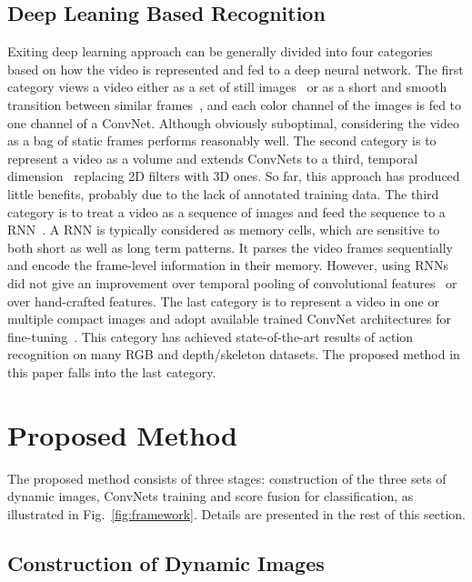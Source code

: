 \documentclass[10pt, a4paper, conference]{IEEEtran}
\begin{document}
\subsection{Deep Leaning Based Recognition}
Exiting deep learning approach can be generally divided into four categories based on how the video is represented and fed to a deep neural network. The first category views a video either as a set of still images~\cite{yue2015beyond} or as a short and smooth transition between similar frames~\cite{simonyan2014two}, and each color channel of the images is fed to one channel of a ConvNet. Although obviously suboptimal, considering the video as a bag of static frames performs reasonably well. The second category is to represent a video as a volume and extends ConvNets to a third, temporal dimension~\cite{ji20133d,tran2015learning} replacing 2D filters with 3D ones. So far, this approach has produced little benefits, probably due to the lack of annotated training data. The third category is to treat a video as a sequence of images and feed the sequence to a RNN~\cite{donahue2015long,du2015hierarchical,veeriah2015differential,zhu2015co,shahroudy2016ntu}. A RNN is typically considered as memory cells, which are sensitive to both short as well as long term patterns. It parses the video frames sequentially and encode the frame-level information in their memory. However, using RNNs did not give an improvement over temporal pooling of convolutional features~\cite{yue2015beyond} or over hand-crafted features. The last category is to represent a video in one or multiple compact images and adopt available trained ConvNet architectures for fine-tuning~\cite{pichao2015,pichaoTHMS,pichao2016,bilen2016dynamic}. This category has achieved state-of-the-art results of action recognition on many RGB and depth/skeleton datasets. The proposed method in this paper falls into the last category.

\section{Proposed Method}

The proposed method consists of three stages: construction of the three sets of dynamic images, ConvNets training and score fusion for classification, as illustrated in Fig.~\ref{fig:framework}. Details are presented in the rest of this section. 

\subsection{Construction of Dynamic Images}
\end{document}
